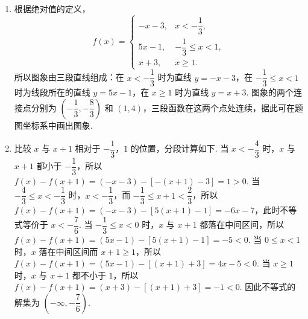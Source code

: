 \begin{solution}
\begin{enumerate}
\item 根据绝对值的定义，
\[
f(x)=\begin{cases}
-x-3, & x< -\dfrac{1}{3},\\
5x-1, & -\dfrac{1}{3}\le x<1,\\
x+3, & x\ge1.
\end{cases}
\]
所以图象由三段直线组成：在 \(x< -\dfrac{1}{3}\) 时为直线 \(y=-x-3\)，在 \(-\dfrac{1}{3}\le x<1\) 时为线段所在的直线 \(y=5x-1\)，在 \(x\ge1\) 时为直线 \(y=x+3\). 图象的两个连接点分别为 \(\left(-\dfrac{1}{3},-\dfrac{8}{3}\right)\) 和 \((1,4)\)，三段函数在这两个点处连续，据此可在题图坐标系中画出图象.


\item 比较 \(x\) 与 \(x+1\) 相对于 \(-\dfrac{1}{3}\)，\(1\) 的位置，分段计算如下. 当 \(x< -\dfrac{4}{3}\) 时，\(x\) 与 \(x+1\) 都小于 \(-\dfrac{1}{3}\)，所以
\(f(x)-f(x+1)=(-x-3)-[-(x+1)-3]=1>0\). 当 \(-\dfrac{4}{3}\le x< -\dfrac{1}{3}\) 时，\(x< -\dfrac{1}{3}\)，而 \(-\dfrac{1}{3}\le x+1<\dfrac{2}{3}\)，所以
\(f(x)-f(x+1)=(-x-3)-[5(x+1)-1]=-6x-7\)，此时不等式等价于 \(x< -\dfrac{7}{6}\). 当 \(-\dfrac{1}{3}\le x<0\) 时，\(x\) 与 \(x+1\) 都落在中间区间，所以
\(f(x)-f(x+1)=(5x-1)-[5(x+1)-1]=-5<0\). 当 \(0\le x<1\) 时，\(x\) 落在中间区间而 \(x+1\ge1\)，所以
\(f(x)-f(x+1)=(5x-1)-[(x+1)+3]=4x-5<0\). 当 \(x\ge1\) 时，\(x\) 与 \(x+1\) 都不小于 \(1\)，所以
\(f(x)-f(x+1)=(x+3)-[(x+1)+3]=-1<0\). 因此不等式的解集为 \(\left(-\infty,-\dfrac{7}{6}\right)\).
\end{enumerate}
\end{solution}
